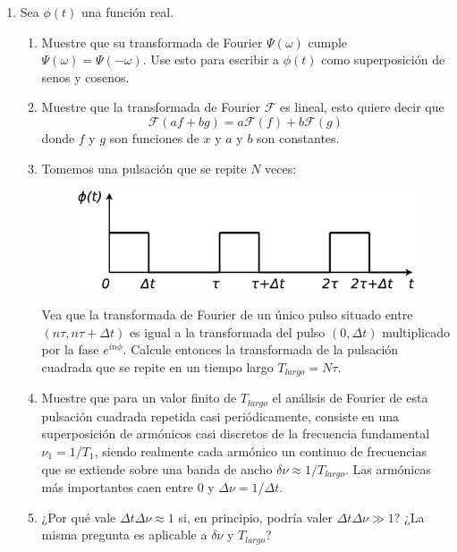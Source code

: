 \documentclass[11pt,spanish]{article}
\begin{document}
\begin{enumerate}

    \item Sea $\phi(t)$ una función real.

    \begin{enumerate}
        \item Muestre que su transformada de Fourier $\Psi(\omega)$ cumple $\Psi(\omega)=\Psi(-\omega)$.
        Use esto para escribir a $\phi(t)$ como superposición de senos y
        cosenos.
        \item Muestre que la transformada de Fourier $\mathcal{F}$ es lineal, esto
        quiere decir que
        \[
        \mathcal{F}(af+bg)=a\mathcal{F}(f)+b\mathcal{F}(g)
        \]
        donde $f$ y $g$ son funciones de $x$ y $a$ y $b$ son constantes.
        \item Tomemos una pulsación que se repite $N$ veces:

        \begin{figure}[H]
            \centering{}\includegraphics[clip,scale=0.25]{figs/ej2-18}
        \end{figure}

        Vea que la transformada de Fourier de un único pulso situado entre
        $(n\tau,n\tau+\Delta t)$ es igual a la transformada del pulso $(0,\Delta t)$
        multiplicado por la fase $e^{in\phi}$. Calcule entonces la transformada
        de la pulsación cuadrada que se repite en un tiempo largo $T_{largo}=N\tau$.

        \item Muestre que para un valor finito de $T_{largo}$ el análisis de Fourier
        de esta pulsación cuadrada repetida casi periódicamente, consiste
        en una superposición de armónicos casi discretos de la frecuencia
        fundamental $\nu_{1}=1/T_{1}$, siendo realmente cada armónico un
        continuo de frecuencias que se extiende sobre una banda de ancho $\delta\nu\approx1/T_{largo}$.
        Las armónicas más importantes caen entre 0 y $\Delta\nu=1/\Delta t$.

        \item ¿Por qué vale $\Delta t\Delta\nu\approx1$ si, en principio, podría
        valer $\Delta t\Delta\nu\gg1$? ¿La misma pregunta es aplicable a
        $\delta\nu$ y $T_{largo}$?
    \end{enumerate}
    

\end{enumerate}
\end{document}
